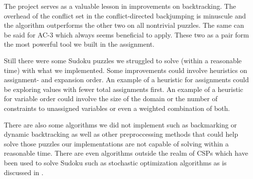 The project serves as a valuable lesson in improvements on backtracking.  The overhead of the conflict set in the conflict-directed backjumping is minuscule and the algorithm outperforms the other two on all nontrivial puzzles. The same can be said for AC-3 which always seems beneficial to apply. These two as a pair form the most powerful tool we built in the assignment.

Still there were some Sudoku puzzles we struggled to solve (within a reasonable time) with what we implemented. Some improvements could involve heuristics on assignment- and expansion order. An example of a heuristic for assignments could be exploring values with fewer total assignments first. An example of a heuristic for variable order could involve the size of the domain or the number of constraints to unassigned variables or even a weighted combination of both.

There are also some algorithms we did not implement such as backmarking or dynamic backtracking as well as other preproccessing methods that could help solve those puzzles our implementations are not capable of solving within a reasonable time. There are even algorithms outside the realm of CSPs which have been used to solve Sudoku such as stochastic optimization algorithms as is discussed in \cite{bib:art2}.
